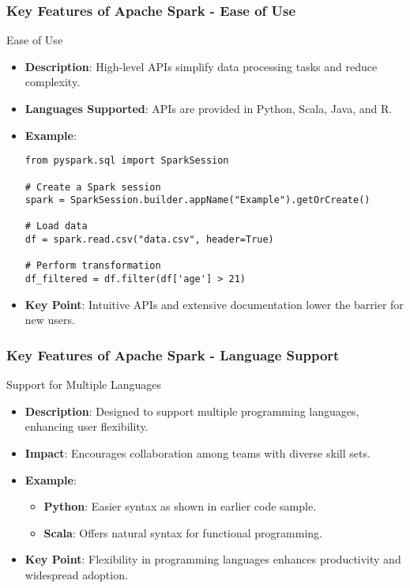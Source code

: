 \documentclass{beamer}
\begin{document}
\begin{frame}[fragile]
    \frametitle{Key Features of Apache Spark - Ease of Use}
    \begin{block}{Ease of Use}
        \begin{itemize}
            \item \textbf{Description}: High-level APIs simplify data processing tasks and reduce complexity.
            \item \textbf{Languages Supported}: APIs are provided in Python, Scala, Java, and R.
            \item \textbf{Example}:
            \begin{lstlisting}
from pyspark.sql import SparkSession

# Create a Spark session
spark = SparkSession.builder.appName("Example").getOrCreate()

# Load data
df = spark.read.csv("data.csv", header=True)

# Perform transformation
df_filtered = df.filter(df['age'] > 21)
            \end{lstlisting}
            \item \textbf{Key Point}: Intuitive APIs and extensive documentation lower the barrier for new users.
        \end{itemize}
    \end{block}
\end{frame}

\begin{frame}[fragile]
    \frametitle{Key Features of Apache Spark - Language Support}
    \begin{block}{Support for Multiple Languages}
        \begin{itemize}
            \item \textbf{Description}: Designed to support multiple programming languages, enhancing user flexibility.
            \item \textbf{Impact}: Encourages collaboration among teams with diverse skill sets.
            \item \textbf{Example}:
                \begin{itemize}
                    \item \textbf{Python}: Easier syntax as shown in earlier code sample.
                    \item \textbf{Scala}: Offers natural syntax for functional programming.
                \end{itemize}
            \item \textbf{Key Point}: Flexibility in programming languages enhances productivity and widespread adoption.
        \end{itemize}
    \end{block}
\end{frame}
\end{document}
